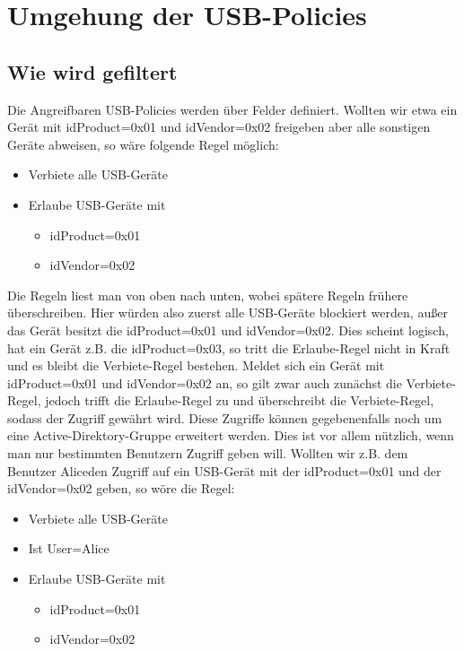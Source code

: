 \chapter{Umgehung der USB-Policies}\label{Angriff}

\section{Wie wird gefiltert}
Die Angreifbaren USB-Policies werden über Felder definiert. Wollten wir etwa ein Gerät mit idProduct=0x01 und idVendor=0x02 freigeben aber alle sonstigen Geräte abweisen, so wäre folgende Regel möglich:
			\begin{itemize}
				\item Verbiete alle USB-Geräte
				\item Erlaube USB-Geräte mit
				\begin{itemize}
					\item idProduct=0x01
					\item idVendor=0x02
				\end{itemize}
			\end{itemize}
Die Regeln liest man von oben nach unten, wobei spätere Regeln frühere überschreiben. Hier würden also zuerst alle USB-Geräte blockiert werden, außer das Gerät besitzt die idProduct=0x01 und idVendor=0x02. Dies scheint logisch, hat ein Gerät z.B. die idProduct=0x03, so tritt die \glqq Erlaube\grqq-Regel nicht in Kraft und es bleibt die \glqq Verbiete\grqq-Regel bestehen. Meldet sich ein Gerät mit idProduct=0x01 und idVendor=0x02 an, so gilt zwar auch zunächst die \glqq Verbiete\grqq-Regel, jedoch trifft die \glqq Erlaube\grqq-Regel zu und überschreibt die \glqq Verbiete\grqq-Regel, sodass der Zugriff gewährt wird.
Diese Zugriffe können gegebenenfalls noch um eine Active-Direktory-Gruppe erweitert werden. Dies ist vor allem nützlich, wenn man nur bestimmten Benutzern Zugriff geben will. Wollten wir z.B. dem Benutzer \glqq Alice\grqq den Zugriff auf ein USB-Gerät mit der idProduct=0x01 und der idVendor=0x02 geben, so wöre die Regel:
			\begin{itemize}
				\item Verbiete alle USB-Geräte
				\item Ist User=\glqq Alice\grqq
				\item Erlaube USB-Geräte mit
				\begin{itemize}
					\item idProduct=0x01
					\item idVendor=0x02
				\end{itemize} 
			\end{itemize}

